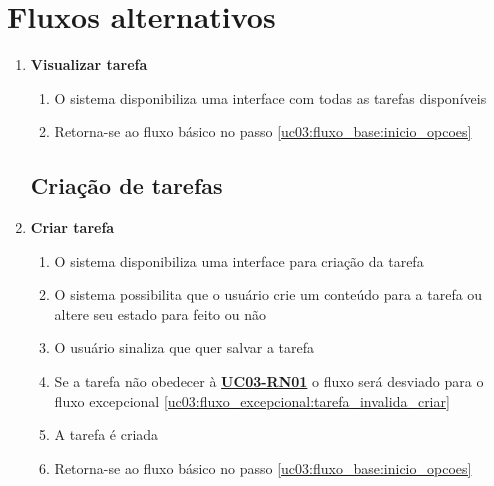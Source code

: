 \documentclass[
	12pt,				%
	oneside,			%
	a4paper,			%
	english,			%
	brazil,				%
	]{abntex2}
\begin{document}
\section{Fluxos alternativos}
\begin{enumerate}[label=\textbf{UC03-FA{\arabic*}},font=\normalsize]
    \subsection{Visualização de tarefas}
    \item \textbf{\normalsize Visualizar tarefa} \label{uc03:fluxo_alternativo:visualizar_tarefa}
    \begin{enumerate}[label={\arabic*}.]
        \item O sistema disponibiliza uma interface com todas as tarefas disponíveis 
        \item Retorna-se ao fluxo básico no passo \ref{uc03:fluxo_base:inicio_opcoes}
    \end{enumerate}
    
    \subsection{Criação de tarefas}
    \item \textbf{\normalsize Criar tarefa}
    \label{uc03:fluxo_alternativo:criar_tarefa}
    \begin{enumerate}[label={\arabic*}.]
        \item O sistema disponibiliza uma interface para criação da tarefa
        \item O sistema possibilita que o usuário crie um conteúdo para a tarefa ou altere seu estado para feito ou não \label{uc03:fluxo_alternativo:criar_tarefa:inicio_interacao}
        \item O usuário sinaliza que quer salvar a tarefa
        \item Se a tarefa não obedecer à \textbf{\hyperref[uc03:rn01_validar_tarefa]{UC03-RN01}} o fluxo será desviado para o fluxo excepcional \ref{uc03:fluxo_excepcional:tarefa_invalida_criar}
        \item A tarefa é criada
        \item Retorna-se ao fluxo básico no passo \ref{uc03:fluxo_base:inicio_opcoes}
    \end{enumerate}
    

\end{enumerate}
\end{document}
